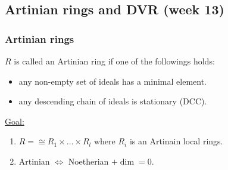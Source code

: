 \subsection{Artinian rings and DVR (week 13)}
\subsubsection{Artinian rings}

\begin{definition}
  $R$ is called an Artinian ring if one of the followings holds:
  \begin{itemize}
    \item any non-empty set of ideals has a minimal element.
    \item any descending chain of ideals is stationary (DCC).
  \end{itemize}
\end{definition}


\underline{Goal:}
\begin{enumerate}
  \item $R = \cong R_1 \times \dots \times R_l$ where $R_i$ is an Artinain
    local rings.
  \item Artinian $\iff$ Noetherian $+ \dim = 0$.
\end{enumerate}

